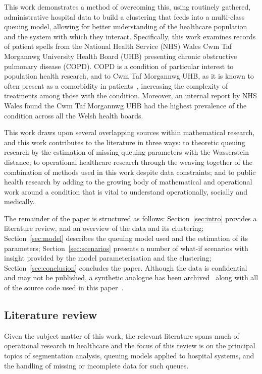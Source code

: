 \documentclass[11pt]{article}
\begin{document}
This work demonstrates a method of overcoming this, using routinely gathered,
administrative hospital data to build a clustering that feeds into a multi-class
queuing model, allowing for better understanding of the healthcare population
and the system with which they interact. Specifically, this work examines
records of patient spells from the National Health Service (NHS) Wales Cwm Taf
Morgannwg University Health Board (UHB) presenting chronic obstructive pulmonary
disease (COPD). COPD is a condition of particular interest to population health
research, and to Cwm Taf Morgannwg UHB, as it is known to often present as a
comorbidity in patients~\cite{Houben2019}, increasing the complexity of
treatments among those with the condition. Moreover, an internal report by NHS
Wales found the Cwm Taf Morgannwg UHB had the highest prevalence of the
condition across all the Welsh health boards.

This work draws upon several overlapping sources within
mathematical research, and this work contributes to the literature in three
ways: to theoretic queuing research by the estimation of missing queuing
parameters with the Wasserstein distance; to operational healthcare research
through the weaving together of the combination of methods used in this work
despite data constraints; and to public health research by adding to the growing
body of mathematical and operational work around a condition that is vital to
understand operationally, socially and medically.

The remainder of the paper is structured as follows: Section~\ref{sec:intro}
provides a literature review, and an overview of the data and its clustering;
Section~\ref{sec:model} describes the queuing model used and the estimation of
its parameters; Section~\ref{sec:scenarios} presents a number of what-if
scenarios with insight provided by the model parameterisation and the
clustering; Section~\ref{sec:conclusion} concludes the paper. Although the data
is confidential and may not be published, a synthetic analogue has been
archived~\cite{Wilde2020synthetic} along with all of the source code used in
this paper~\cite{Wilde2020github}.


\subsection{Literature review}\label{subsec:review}

Given the subject matter of this work, the relevant literature spans much of
operational research in healthcare and the focus of this review is on the
principal topics of segmentation analysis, queuing models applied to hospital
systems, and the handling of missing or incomplete data for such queues.
\end{document}
